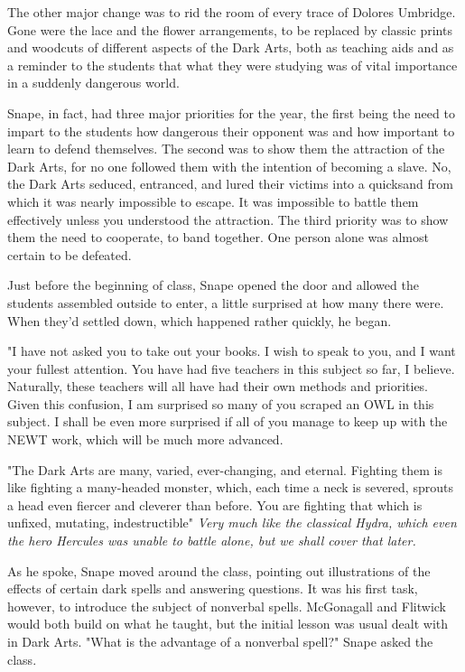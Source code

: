The other major change was to rid the room of every trace of Dolores Umbridge. Gone were the lace and the flower arrangements, to be replaced by classic prints and woodcuts of different aspects of the Dark Arts, both as teaching aids and as a reminder to the students that what they were studying was of vital importance in a suddenly dangerous world.

Snape, in fact, had three major priorities for the year, the first being the need to impart to the students how dangerous their opponent was and how important to learn to defend themselves. The second was to show them the attraction of the Dark Arts, for no one followed them with the intention of becoming a slave. No, the Dark Arts seduced, entranced, and lured their victims into a quicksand from which it was nearly impossible to escape. It was impossible to battle them effectively unless you understood the attraction. The third priority was to show them the need to cooperate, to band together. One person alone was almost certain to be defeated.

Just before the beginning of class, Snape opened the door and allowed the students assembled outside to enter, a little surprised at how many there were. When they'd settled down, which happened rather quickly, he began.

"I have not asked you to take out your books. I wish to speak to you, and I want your fullest attention. You have had five teachers in this subject so far, I believe. Naturally, these teachers will all have had their own methods and priorities. Given this confusion, I am surprised so many of you scraped an OWL in this subject. I shall be even more surprised if all of you manage to keep up with the NEWT work, which will be much more advanced.

"The Dark Arts are many, varied, ever-changing, and eternal. Fighting them is like fighting a many-headed monster, which, each time a neck is severed, sprouts a head even fiercer and cleverer than before. You are fighting that which is unfixed, mutating, indestructible{\el}" \emph{Very much like the classical Hydra, which even the hero Hercules was unable to battle alone, but we shall cover that later.}

As he spoke, Snape moved around the class, pointing out illustrations of the effects of certain dark spells and answering questions. It was his first task, however, to introduce the subject of nonverbal spells. McGonagall and Flitwick would both build on what he taught, but the initial lesson was usual dealt with in Dark Arts. "What is the advantage of a nonverbal spell?" Snape asked the class.


